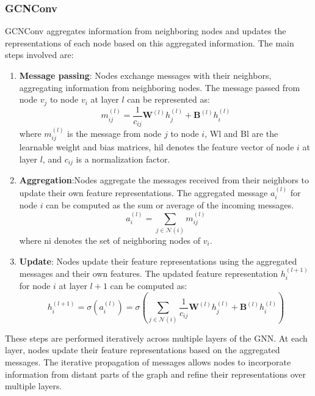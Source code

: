 \subsubsection{GCNConv}
GCNConv aggregates information from neighboring nodes and updates the representations of each node based on this aggregated information. The main steps involved are:
\begin{enumerate} 
    \item \textbf{Message passing}: Nodes exchange messages with their neighbors, aggregating information from neighboring nodes. The message passed from node $v_j$ to node $v_i$ at layer $l$ can be represented as:
        \[ m_{ij}^{(l)} = \frac{1}{c_{ij}} \mathbf{W}^{(l)} h_j^{(l)} + \mathbf{B}^{(l)} h_i^{(l)}  \]
        where $m_{ij}^{(l)}$ is the message from node $j$ to node $i$, \gls{Wl} and \gls{Bl} are the learnable weight and bias matrices, \gls{hil} denotes the feature vector of node $i$ at layer $l$, and $c_{ij}$ is a normalization factor.
    \item \textbf{Aggregation}:Nodes aggregate the messages received from their neighbors to update their own feature representations. The aggregated message $a_i^{(l)}$ for node $i$ can be computed as the sum or average of the incoming messages.
        \[ a_i^{(l)} = \sum_{j \in \mathcal{N}(i)} m_{ij}^{(l)} \]
    where \gls{ni} denotes the set of neighboring nodes of $v_i$.
    \item \textbf{Update}: Nodes update their feature representations using the aggregated messages and their own features. The updated feature representation $h_i^{(l+1)}$ for node $i$ at layer $l+1$ can be computed as:
        \[ h_i^{(l+1)} = \sigma(a_i^{(l)}) = \sigma \left(\sum_{j \in \mathcal{N}(i)} \frac{1}{c_{ij}} \mathbf{W}^{(l)} h_j^{(l)} + \mathbf{B}^{(l)} h_i^{(l)} \right)\]
\end{enumerate}
These steps are performed iteratively across multiple layers of the GNN. At each layer, nodes update their feature representations based on the aggregated messages. The iterative propagation of messages allows nodes to incorporate information from distant parts of the graph and refine their representations over multiple layers. \\

